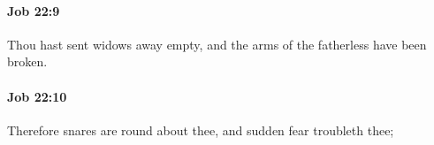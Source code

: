 		\paragraph{Job 22:9} %
			\label{JOB-22-9}

			Thou hast sent widows away empty, and the arms of the fatherless have been broken.


		\paragraph{Job 22:10} %
			\label{JOB-22-10}

			Therefore snares are round about thee, and sudden fear troubleth thee;


